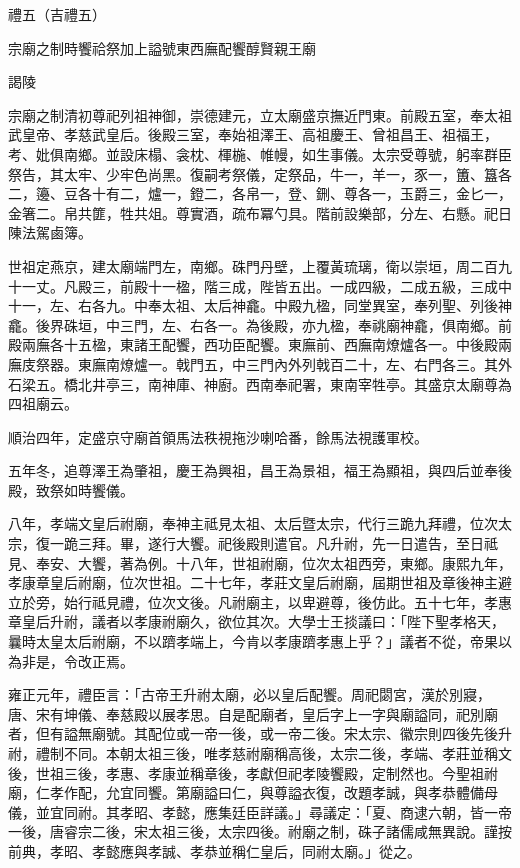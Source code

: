 
\begin{pinyinscope}
禮五（吉禮五）

宗廟之制時饗祫祭加上謚號東西廡配饗醇賢親王廟

謁陵

宗廟之制清初尊祀列祖神御，崇德建元，立太廟盛京撫近門東。前殿五室，奉太祖武皇帝、孝慈武皇后。後殿三室，奉始祖澤王、高祖慶王、曾祖昌王、祖福王，考、妣俱南鄉。並設床榻、衾枕、楎椸、帷幔，如生事儀。太宗受尊號，躬率群臣祭告，其太牢、少牢色尚黑。復嗣考祭儀，定祭品，牛一，羊一，豕一，簠、簋各二，籩、豆各十有二，爐一，鐙二，各帛一，登、鉶、尊各一，玉爵三，金匕一，金箸二。帛共篚，牲共俎。尊實酒，疏布冪勺具。階前設樂部，分左、右懸。祀日陳法駕鹵簿。

世祖定燕京，建太廟端門左，南鄉。硃門丹壁，上覆黃琉璃，衛以崇垣，周二百九十一丈。凡殿三，前殿十一楹，階三成，陛皆五出。一成四級，二成五級，三成中十一，左、右各九。中奉太祖、太后神龕。中殿九楹，同堂異室，奉列聖、列後神龕。後界硃垣，中三門，左、右各一。為後殿，亦九楹，奉祧廟神龕，俱南鄉。前殿兩廡各十五楹，東諸王配饗，西功臣配饗。東廡前、西廡南燎爐各一。中後殿兩廡庋祭器。東廡南燎爐一。戟門五，中三門內外列戟百二十，左、右門各三。其外石梁五。橋北井亭三，南神庫、神廚。西南奉祀署，東南宰牲亭。其盛京太廟尊為四祖廟云。

順治四年，定盛京守廟首領馬法秩視拖沙喇哈番，餘馬法視護軍校。

五年冬，追尊澤王為肇祖，慶王為興祖，昌王為景祖，福王為顯祖，與四后並奉後殿，致祭如時饗儀。

八年，孝端文皇后祔廟，奉神主祗見太祖、太后暨太宗，代行三跪九拜禮，位次太宗，復一跪三拜。畢，遂行大饗。祀後殿則遣官。凡升祔，先一日遣告，至日祗見、奉安、大饗，著為例。十八年，世祖祔廟，位次太祖西旁，東鄉。康熙九年，孝康章皇后祔廟，位次世祖。二十七年，孝莊文皇后祔廟，屆期世祖及章後神主避立於旁，始行祗見禮，位次文後。凡祔廟主，以卑避尊，後仿此。五十七年，孝惠章皇后升祔，議者以孝康祔廟久，欲位其次。大學士王掞議曰：「陛下聖孝格天，曩時太皇太后祔廟，不以躋孝端上，今肯以孝康躋孝惠上乎？」議者不從，帝果以為非是，令改正焉。

雍正元年，禮臣言：「古帝王升祔太廟，必以皇后配饗。周祀閟宮，漢於別寢，唐、宋有坤儀、奉慈殿以展孝思。自是配廟者，皇后字上一字與廟謚同，祀別廟者，但有謚無廟號。其配位或一帝一後，或一帝二後。宋太宗、徽宗則四後先後升祔，禮制不同。本朝太祖三後，唯孝慈祔廟稱高後，太宗二後，孝端、孝莊並稱文後，世祖三後，孝惠、孝康並稱章後，孝獻但祀孝陵饗殿，定制然也。今聖祖祔廟，仁孝作配，允宜同饗。第廟謚曰仁，與尊謚衣復，改題孝誠，與孝恭體備母儀，並宜同祔。其孝昭、孝懿，應集廷臣詳議。」尋議定：「夏、商逮六朝，皆一帝一後，唐睿宗二後，宋太祖三後，太宗四後。祔廟之制，硃子諸儒咸無異說。謹按前典，孝昭、孝懿應與孝誠、孝恭並稱仁皇后，同祔太廟。」從之。


\end{pinyinscope}
